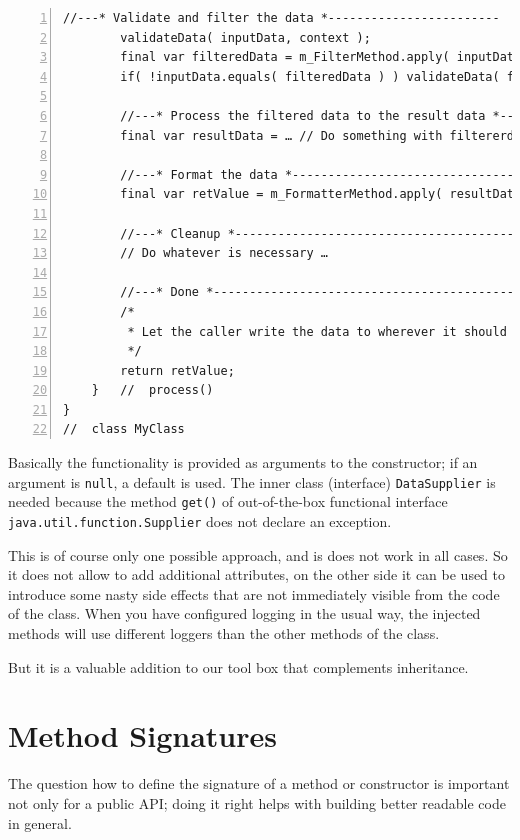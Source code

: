 \documentclass[11pt,a4paper, titlepage, parskip=half, headsepline, footsepline, cleardoublepage=current, headheight=1cm]{scrbook}
\begin{document}
\begin{lstlisting}[numbers=left]
        //---* Validate and filter the data *------------------------
        validateData( inputData, context );
        final var filteredData = m_FilterMethod.apply( inputData, context );
        if( !inputData.equals( filteredData ) ) validateData( filteredData, context );

        //---* Process the filtered data to the result data *--------
        final var resultData = … // Do something with filtererdData

        //---* Format the data *-------------------------------------
        final var retValue = m_FormatterMethod.apply( resultData, context );

        //---* Cleanup *---------------------------------------------
        // Do whatever is necessary …

        //---* Done *------------------------------------------------
        /*
         * Let the caller write the data to wherever it should end up.
         */
        return retValue;
    }   //  process()
}
//  class MyClass
\end{lstlisting}
Basically the functionality is provided as arguments to the constructor; if an argument is \lstinline|null|, a default is used. The inner class (interface) \lstinline|DataSupplier| is needed because the method \lstinline|get()| of out-of-the-box functional interface \lstinline|java.util.function.Supplier|\autocite{ORACLE_DOC_SUPPLIER_INTERFACE} does not declare an exception.

This is of course only one possible approach, and is does not work in all cases. So it does not allow to add additional attributes, on the other side it can be used to introduce some nasty side effects that are not immediately visible from the code of the class. When you have configured logging in the usual way, the injected methods will use different loggers than the other methods of the class.

But it is a valuable addition to our tool box that complements inheritance.


\section{Method Signatures}\label{sec:MethodSignatures}
The question how to define the signature of a method or constructor is important not only for a public API; doing it right helps with building better readable code in general.
\end{document}
